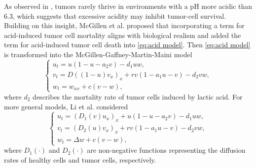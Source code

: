 \documentclass[preprint,sort&compress,final,12pt]{elsarticle}
\numberwithin{equation}{section}
\begin{document}
As observed in \cite{Casciari JJ 1992, cellular necrosis}, tumors rarely thrive in environments with a pH more acidic than 6.3,
which suggests that excessive acidity may inhibit tumor-cell survival. Building on this insight, McGillen et al. \cite{J.B. McGillen JMB} proposed that incorporating a term for acid-induced tumor cell mortality aligns with biological realism and added the term for acid-induced tumor cell death into \eqref{eq:acid model}. Then \eqref{eq:acid model} is transformed into the McGillen-Gaffney-Martin-Maini model
\begin{equation}\label{eq:generalized acid model}
\begin{cases}
u_t=u(1-u-a_2v)-d_1uw,\\[0.2cm]
v_t=D((1-u)v_x)_x+rv\left(1-a_1u-v\right)-d_2vw,\\[0.2cm]
w_t=w_{xx}+c(v-w),
\end{cases}
\end{equation}
where $d_2$ describes the mortality rate of tumor cells induced by lactic acid. For more general models,  Li et al. \cite{2024 Lifang ZAMP} considered
\begin{equation}\label{eq:The most general acid model}
\begin{cases}
u_t=(D_1(v)u_x)_x+u\left(1-u-a_2v\right)-d_1uw,\\[0.2cm]
v_t=(D_2(u)v_x)_x+rv\left(1-a_1u-v\right)-d_2vw,\\[0.2cm]
w_t=\Delta w+c(v-w),
\end{cases}
\end{equation}
 where $D_1(\cdot)$ and $D_2(\cdot)$ are non-negative functions representing the diffusion rates of healthy cells and tumor cells, respectively.
\end{document}
